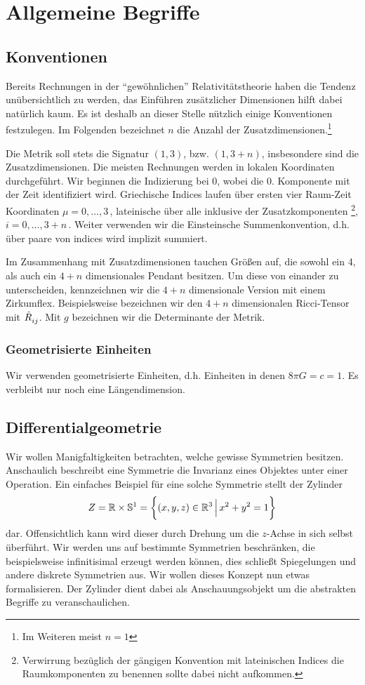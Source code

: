 \chapter{Allgemeine Begriffe}

\section{Konventionen}
Bereits Rechnungen in der "`gewöhnlichen"' Relativitätstheorie haben die Tendenz
unübersichtlich zu werden, das Einführen zusätzlicher Dimensionen hilft dabei
natürlich kaum.
Es ist deshalb an dieser Stelle nützlich einige Konventionen festzulegen. Im
Folgenden bezeichnet $n$ die Anzahl der Zusatzdimensionen.\footnote{Im Weiteren
meist $n=1$}

Die Metrik soll stets die Signatur $(1,3)$, bzw. $(1,3+n)$, insbesondere sind
die Zusatzdimensionen. Die meisten Rechnungen werden in lokalen Koordinaten
durchgeführt.
Wir beginnen die Indizierung bei 0, wobei die 0. Komponente mit der Zeit identifiziert wird.
Griechische Indices laufen über ersten vier Raum-Zeit Koordinaten
$\mu=0,\ldots,3\,$, lateinische über alle inklusive der
Zusatzkomponenten \footnote{Verwirrung bezüglich der gängigen Konvention
mit lateinischen Indices die Raumkomponenten zu benennen sollte dabei nicht
aufkommen.}, $i=0,\ldots,3+n\,$. Weiter verwenden wir die Einsteinsche
Summenkonvention, d.h. über paare von indices wird implizit summiert.

Im Zusammenhang mit Zusatzdimensionen tauchen Größen auf, die sowohl ein 4, als
auch ein $4+n$ dimensionales Pendant besitzen. Um diese von einander zu
unterscheiden, kennzeichnen wir die $4+n$ dimensionale Version mit einem
Zirkumflex.
Beispielsweise bezeichnen wir den $4+n$ dimensionalen Ricci-Tensor mit
$\tensor{\hat{R}}{_i_j}$. Mit $g$ bezeichnen wir die Determinante der Metrik.
\subsection*{Geometrisierte Einheiten}
Wir verwenden geometrisierte Einheiten, d.h. Einheiten in denen
$8\pi G=c=1$. Es verbleibt nur noch eine Längendimension.
\section{Differentialgeometrie}
Wir wollen Manigfaltigkeiten betrachten, welche gewisse Symmetrien besitzen.
Anschaulich beschreibt eine Symmetrie die Invarianz eines Objektes unter einer
Operation.
Ein einfaches Beispiel für eine solche Symmetrie stellt der Zylinder
\begin{equation}
Z=\Reals\times\Sphere^1=\left\{(x,y,z)\in\Reals^3\,\Big|\,x^2+y^2=1\right\}
\end{equation}
dar. Offensichtlich kann wird dieser durch Drehung um die $z$-Achse in sich
selbst überführt.
Wir werden uns auf bestimmte Symmetrien beschränken, die
beispielsweise infinitisimal erzeugt werden können, dies schließt Spiegelungen
und andere diskrete Symmetrien aus.
Wir wollen dieses Konzept nun etwas formalisieren. Der Zylinder dient dabei als
Anschauungsobjekt um die abstrakten Begriffe zu veranschaulichen.
